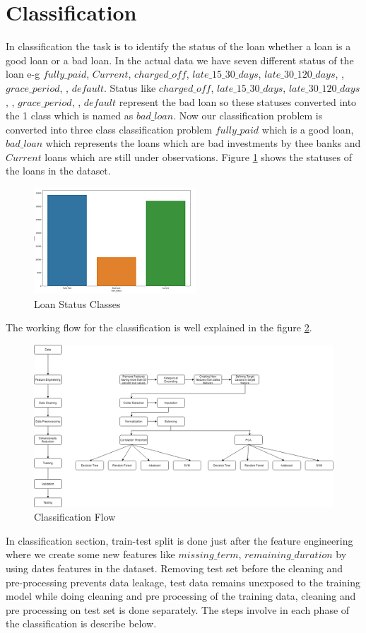 \documentclass[12pt]{article}
\begin{document}
\section{Classification}
In classification the task is to identify the status of the loan whether a loan is a good loan or a bad loan. In the actual data we have seven different status of the loan e-g $fully\_paid$, $Current$, $charged\_off$, $late\_15\_30\_days$, $late\_30\_120\_days$, , $grace\_period$, , $default$. Status like $charged\_off$, $late\_15\_30\_days$, $late\_30\_120\_days$, , $grace\_period$, , $default$ represent the bad loan so these statuses converted into the 1 class which is named as $bad\_loan$. Now our classification problem is converted into three class classification problem $fully\_paid$ which is a good loan, $bad\_loan$ which represents the loans which are bad investments by thee banks and $Current$ loans which are still under observations. Figure \ref{fig:classes} shows the statuses of the loans in the dataset.
\begin{figure}[h!]
	\centering
	\includegraphics{classes.png}
	\caption{Loan Status Classes}
	\label{fig:classes}
\end{figure}
The working flow for the classification is well explained in the figure \ref{fig:c_flow}.
\begin{figure}[h!]
	\centering
	\includegraphics[width=\textwidth]{c_flow.png}
	\caption{Classification Flow}
	\label{fig:c_flow}
\end{figure}
In classification section, train-test split is done just after the feature engineering where we create some new features like $missing\_term$, $remaining\_duration$ by using dates features in the dataset. Removing test set before the cleaning and pre-processing prevents data leakage, test data remains unexposed to the training model while doing cleaning and pre processing of the training data, cleaning and pre processing on test set is done separately. The steps involve in each phase of the classification is describe below.
\end{document}
